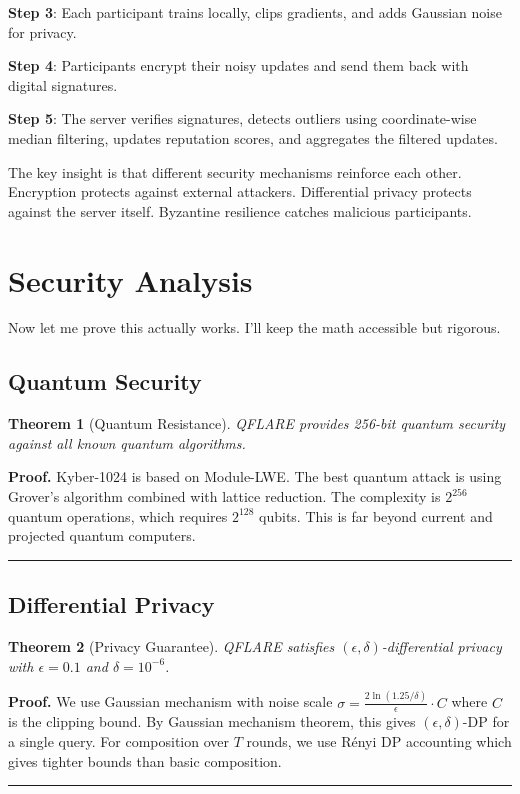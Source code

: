 \documentclass[journal,onecolumn]{IEEEtran}
\newtheorem{theorem}{Theorem}
\newenvironment{proof}[1][Proof]{\noindent\textbf{#1.} }{\ \rule{0.5em}{0.5em}}
\begin{document}
\textbf{Step 3}: Each participant trains locally, clips gradients, and adds Gaussian noise for privacy.

\textbf{Step 4}: Participants encrypt their noisy updates and send them back with digital signatures.

\textbf{Step 5}: The server verifies signatures, detects outliers using coordinate-wise median filtering, updates reputation scores, and aggregates the filtered updates.

The key insight is that different security mechanisms reinforce each other. Encryption protects against external attackers. Differential privacy protects against the server itself. Byzantine resilience catches malicious participants.

\section{Security Analysis}
\label{sec:security}

Now let me prove this actually works. I'll keep the math accessible but rigorous.

\subsection{Quantum Security}

\begin{theorem}[Quantum Resistance]
QFLARE provides 256-bit quantum security against all known quantum algorithms.
\end{theorem}

\begin{proof}
Kyber-1024 is based on Module-LWE. The best quantum attack is using Grover's algorithm combined with lattice reduction. The complexity is $2^{256}$ quantum operations, which requires $2^{128}$ qubits. This is far beyond current and projected quantum computers.
\end{proof}

\subsection{Differential Privacy}

\begin{theorem}[Privacy Guarantee]
QFLARE satisfies $(\epsilon, \delta)$-differential privacy with $\epsilon = 0.1$ and $\delta = 10^{-6}$.
\end{theorem}

\begin{proof}
We use Gaussian mechanism with noise scale $\sigma = \frac{2\ln(1.25/\delta)}{\epsilon} \cdot C$ where $C$ is the clipping bound. By Gaussian mechanism theorem, this gives $(\epsilon, \delta)$-DP for a single query. For composition over $T$ rounds, we use Rényi DP accounting which gives tighter bounds than basic composition.
\end{proof}
\end{document}
